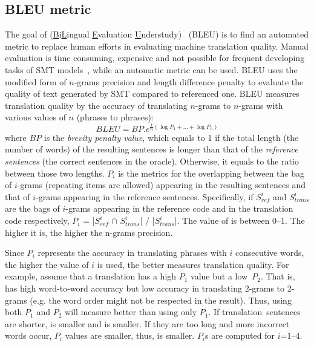 \subsection{BLEU metric}

The goal of (\underline{B}i\underline{L}ingual \underline{E}valuation
\underline{U}nderstudy)~\cite{Papineni2002} (BLEU) is to find an
automated metric to replace human efforts in evaluating machine
translation quality. Manual evaluation is time consuming, expensive
and not possible for frequent developing tasks of SMT
models~\cite{Papineni2002}, while an automatic metric can be
used. BLEU uses the modified form of $n$-grams precision and length
difference penalty to evaluate the quality of text generated by SMT
compared to referenced one.
%
BLEU measures translation quality by the accuracy of translating
$n$-grams to $n$-grams with various values of $n$ (phrases to
phrases):
\[BLEU = BP.{e^{\frac{1}{n}(\log {P_1} + ... + \log {P_n})}}\]
where $BP$ is the {\em brevity penalty value}, which equals to 1 if
the total length (\ie the number of words) of the resulting sentences
is longer than that of the {\em reference sentences} (\ie the correct
sentences in the oracle). Otherwise, it equals to the ratio between
those two lengths. $P_i$ is the metrics for the overlapping between
the bag of $i$-grams (repeating items are allowed) appearing in the
resulting sentences and that of $i$-grams appearing in the reference
sentences. Specifically, if $S^{i}_{ref}$ and $S^{i}_{trans}$ are the
bags of $i$-grams appearing in the reference code and in the
translation code respectively, $P_i$ = |$S^{i}_{ref}$ $\cap$
$S^{i}_{trans}$| / |$S^{i}_{trans}$|. The value of  is
between 0--1. The higher it is, the higher the n-grams precision.

Since $P_i$ represents the accuracy in translating phrases
with $i$ consecutive words, the higher the value of $i$ is used, the
better  measures translation quality. For example, assume
that a translation  has a high $P_1$ value but a
low~$P_2$. That is,  has high word-to-word accuracy but low
accuracy in translating 2-grams to 2-grams (e.g. the word order might
not be respected in the result). Thus, using both $P_1$ and $P_2$ will
measure  better than using only $P_1$. If
translation~sen\-tences are shorter,  is smaller and
 is smaller. If they are too long and more incorrect words
occur, $P_i$ values are smaller, thus,  is smaller. $P_i$s
are computed for $i$=1--4.
